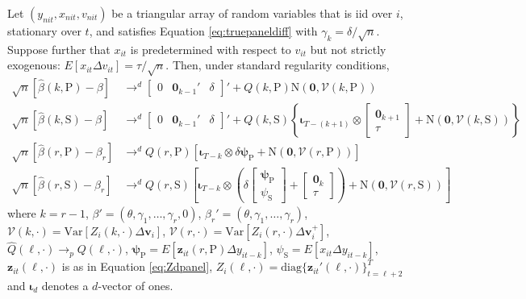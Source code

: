 \begin{thm}
  \label{thm:limitDpanel}
  Let $(y_{nit},x_{nit}, v_{nit})$ be a triangular array of random variables that is iid over $i$, stationary over $t$, and satisfies Equation \ref{eq:truepaneldiff} with $\gamma_k = \delta / \sqrt{n}$.
  Suppose further that $x_{it}$ is predetermined with respect to $v_{it}$ but not strictly exogenous: $E[x_{it}\Delta v_{it}] = \tau/\sqrt{n}$.
  Then, under standard regularity conditions,
  \begin{align*}
    \sqrt{n}\left[ \widehat{\beta}(k,\text{P})-\beta \right] &\rightarrow^d 
    \left[
    \begin{array}{ccc}
    0 & \mathbf{0}_{k-1}'& \delta 
    \end{array}
  \right]' + 
    Q\left(k,\text{P} \right) \mbox{N}\left(\mathbf{0}, \mathcal{V}(k,\text{P})\right)  \\
    \sqrt{n}\left[ \widehat{\beta}(k,\text{S})-\beta \right] &\rightarrow^d 
    \left[
    \begin{array}{ccc}
    0 & \mathbf{0}_{k-1}'& \delta
    \end{array}
  \right]' + 
     Q\left(k,\text{S} \right) \left\{ \boldsymbol{\iota}_{T-(k +1)} \otimes \left[
    \begin{array}{c}
      \mathbf{0}_{k+1} \\ \tau
    \end{array}
  \right] + \mbox{N}\left(\mathbf{0}, \mathcal{V}(k,\text{S})\right)\right\}\\
    \sqrt{n}\left[ \widehat{\beta}(r,\text{P})- \beta_r \right] &\rightarrow^d Q(r,\text{P}) \left[\boldsymbol{\iota}_{T-k} \otimes \delta \boldsymbol{\psi}_{\text{P}} + \mbox{N}\left(\mathbf{0}, \mathcal{V}(r,\text{P}) \right) \right]\\
    \sqrt{n}\left[ \widehat{\beta}(r,\text{S})- \beta_r\right] &\rightarrow^d Q(r,\text{S}) \left[\boldsymbol{\iota}_{T-k} \otimes 
    \left( \delta \left[
  \begin{array}{c}
    \boldsymbol{\psi}_{\text{P}} \\ \psi_{\text{S}}
\end{array}
\right] + \left[
\begin{array}{c}
  \mathbf{0}_{k} \\ \tau
\end{array}
\right]\right) + \mbox{N}\left( \mathbf{0}, \mathcal{V}\left(r,\text{S}\right) \right)\right]
  \end{align*}
  where $k = r - 1$, $\beta' = (\theta, \gamma_1, \hdots, \gamma_{r}, 0)$, $\beta_r' = (\theta, \gamma_1, \hdots, \gamma_{r})$, $\mathcal{V}(k,\cdot) = \mbox{Var}\left[ Z_i(k,\cdot) \Delta \mathbf{v}_i  \right]$, $\mathcal{V}(r,\cdot) = \mbox{Var}\left[ Z_i(r,\cdot) \Delta \mathbf{v}^{+}_i  \right]$, $\widehat{Q}(\ell,\cdot) \rightarrow_p Q(\ell,\cdot)$, $\boldsymbol{\psi}_{\text{P}} = E[\textbf{z}_{it}(r,\text{P}) \Delta y_{it -k}]$, $\psi_{\text{S}} = E[x_{it} \Delta y_{it-k}]$, $\mathbf{z}_{it}(\ell,\cdot)$ is as in Equation \ref{eq:Zdpanel}, $Z_i(\ell, \cdot)= \mbox{diag}\{\mathbf{z}_{it}'(\ell, \cdot)\}_{t=\ell+2}^T$ and $\boldsymbol{\iota}_{d}$ denotes a $d$-vector of ones.
\end{thm}

